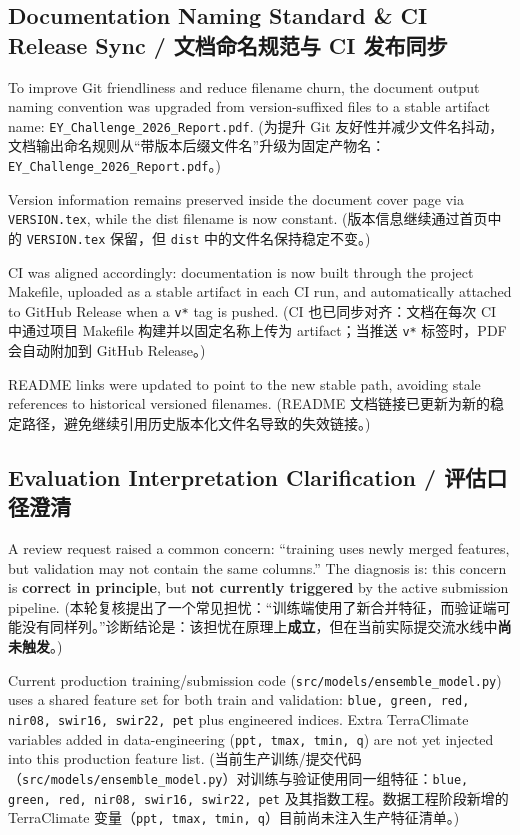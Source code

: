 \subsection{Documentation Naming Standard \& CI Release Sync / 文档命名规范与 CI 发布同步}
To improve Git friendliness and reduce filename churn, the document output naming convention was upgraded from version-suffixed files to a stable artifact name: \texttt{EY\_Challenge\_2026\_Report.pdf}.
(为提升 Git 友好性并减少文件名抖动，文档输出命名规则从“带版本后缀文件名”升级为固定产物名：\texttt{EY\_Challenge\_2026\_Report.pdf}。)

Version information remains preserved inside the document cover page via \texttt{VERSION.tex}, while the dist filename is now constant.
(版本信息继续通过首页中的 \texttt{VERSION.tex} 保留，但 \texttt{dist} 中的文件名保持稳定不变。)

CI was aligned accordingly: documentation is now built through the project Makefile, uploaded as a stable artifact in each CI run, and automatically attached to GitHub Release when a \texttt{v*} tag is pushed.
(CI 也已同步对齐：文档在每次 CI 中通过项目 Makefile 构建并以固定名称上传为 artifact；当推送 \texttt{v*} 标签时，PDF 会自动附加到 GitHub Release。)

README links were updated to point to the new stable path, avoiding stale references to historical versioned filenames.
(README 文档链接已更新为新的稳定路径，避免继续引用历史版本化文件名导致的失效链接。)

\subsection{Evaluation Interpretation Clarification / 评估口径澄清}
A review request raised a common concern: ``training uses newly merged features, but validation may not contain the same columns.'' The diagnosis is: this concern is \textbf{correct in principle}, but \textbf{not currently triggered} by the active submission pipeline.
(本轮复核提出了一个常见担忧：“训练端使用了新合并特征，而验证端可能没有同样列。”诊断结论是：该担忧在原理上\textbf{成立}，但在当前实际提交流水线中\textbf{尚未触发}。)

Current production training/submission code (\texttt{src/models/ensemble\_model.py}) uses a shared feature set for both train and validation: \texttt{blue, green, red, nir08, swir16, swir22, pet} plus engineered indices. Extra TerraClimate variables added in data-engineering (\texttt{ppt, tmax, tmin, q}) are not yet injected into this production feature list.
(当前生产训练/提交代码（\texttt{src/models/ensemble\_model.py}）对训练与验证使用同一组特征：\texttt{blue, green, red, nir08, swir16, swir22, pet} 及其指数工程。数据工程阶段新增的 TerraClimate 变量（\texttt{ppt, tmax, tmin, q}）目前尚未注入生产特征清单。)

